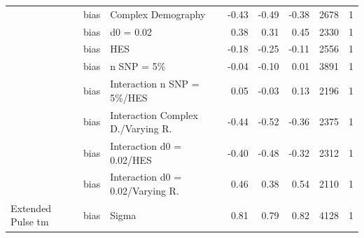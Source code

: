 \documentclass[11pt]{article}
\begin{document}
\begin{table}[H]
\begin{tabular}[t]{l|l|l|r|r|r|r|r}
 & bias & Complex Demography & -0.43 & -0.49 & -0.38 & 2678 & 1\\

 & bias & d0 = 0.02 & 0.38 & 0.31 & 0.45 & 2330 & 1\\

 & bias & HES & -0.18 & -0.25 & -0.11 & 2556 & 1\\

 & bias & n SNP = 5\% & -0.04 & -0.10 & 0.01 & 3891 & 1\\

 & bias & Interaction n SNP = 5\%/HES & 0.05 & -0.03 & 0.13 & 2196 & 1\\

 & bias & Interaction Complex D./Varying R. & -0.44 & -0.52 & -0.36 & 2375 & 1\\

 & bias & Interaction d0 = 0.02/HES & -0.40 & -0.48 & -0.32 & 2312 & 1\\

 & bias & Interaction d0 = 0.02/Varying R. & 0.46 & 0.38 & 0.54 & 2110 & 1\\

\multirow{-12}{*}{\raggedright\arraybackslash Extended Pulse tm} & bias & Sigma & 0.81 & 0.79 & 0.82 & 4128 & 1\\
\hline
\end{tabular}
\end{table}
\end{document}
